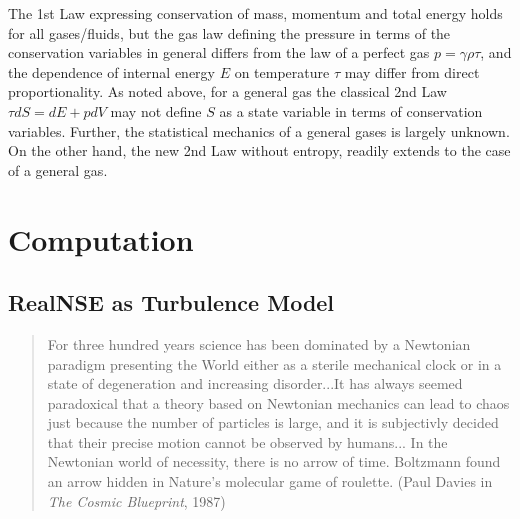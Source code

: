 The 1st Law expressing conservation of mass, momentum and total energy
holds for all gases/fluids, but the gas law defining the
pressure in terms of the conservation variables in general differs
from the law of a perfect gas $p=\gamma\rho\tau$,
and the dependence of internal energy $E$ on temperature $\tau$ may 
differ from direct proportionality.
As noted above, for a general gas the 
classical 2nd Law $\tau dS=dE+pdV$ 
may not define $S$ as a state variable
in terms of conservation variables. Further, the statistical 
mechanics of a general gases is largely unknown. 
On the other hand, the new 2nd Law without entropy, readily extends to
the case of a general gas.


 

\part{Computation}

\chapter{RealNSE as Turbulence Model}

\small



\begin{quote} For three hundred years science has been dominated by 
a Newtonian paradigm presenting the World either
as a sterile mechanical clock or in a state of degeneration 
and increasing disorder...It has always seemed paradoxical
that a theory based on Newtonian mechanics can lead
to chaos just because the number of particles is large, 
and it is subjectivly decided that their precise motion cannot be 
observed by humans... In the Newtonian world of necessity, there
is no arrow of time. Boltzmann found an arrow hidden in  
Nature's molecular game of roulette.
(Paul Davies in \emph{The Cosmic Blueprint}, 1987)
\end{quote} 



